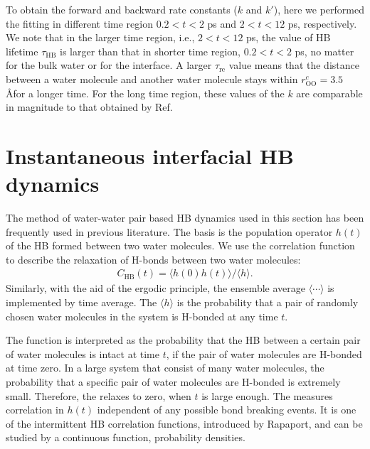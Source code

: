 To obtain the forward and backward rate constants ($k$ and $k'$),
here we performed the fitting in different time region $0.2 < t < 2$ ps and $2 < t < 12$ ps, respectively.
We note that in the larger time region, i.e., $2 < t < 12$ ps, the value of HB lifetime $\tau_\text{HB}$ is larger than that in shorter time region, $0.2 < t < 2$ ps,
no matter for the bulk water or for the interface. A larger $\tau_\text{re}$ value means that the distance between a water molecule and another water molecule 
stays within $r_\text{OO}^c= 3.5$ \AA for a longer time. 
For the long time region, these values of the $k$ are comparable in magnitude to that obtained by Ref. 


\section{Instantaneous interfacial HB dynamics}
The method of water-water pair based HB dynamics used in this section has been frequently used in previous literature.\cite{Luzar1994,AL96,AC00} 
The basis is the population operator $h(t)$ of the HB formed between two water molecules. 
We use the correlation function \CHB to describe the relaxation of H-bonds between two water molecules: 
\begin{eqnarray}
C_{\text{HB}}(t)=\langle h(0)h(t) \rangle/\langle h\rangle
\label{eq:C_HB}.
\end{eqnarray}
Similarly, with the aid of the ergodic principle, the ensemble average $\langle \cdots\rangle$ is implemented by time average.
The $\langle h\rangle$ is the probability that a pair of randomly chosen water molecules in the system is
H-bonded at any time $t$. 

The function \CHB is interpreted as the probability that the HB between a certain pair of water molecules is intact at time  $t$, 
if the pair of water molecules are H-bonded at time zero. 
In a large system that consist of many water molecules, the probability that a specific pair of water molecules are H-bonded is extremely small. 
Therefore, the \CHB relaxes to zero, when $t$ is large enough. 
The \CHB measures correlation in $h(t)$ independent of any possible bond breaking events. 
It is one of the intermittent HB correlation functions, introduced by Rapaport, \cite{Rapaport1983} 
and can be studied by a continuous function, probability densities.

